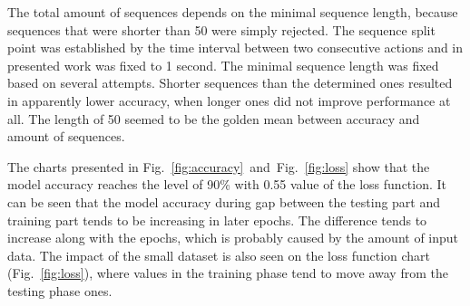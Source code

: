 The total amount of sequences depends on the minimal sequence length, because sequences that were shorter than 50 were simply rejected.
The sequence split point was established by the time interval between two consecutive actions and in presented work was fixed to 1 second.
The minimal sequence length was fixed based on several attempts.
Shorter sequences than the determined ones resulted in apparently lower accuracy, when longer ones did not improve performance at all.
The length of 50 seemed to be the golden mean between accuracy and amount of sequences.

The charts presented in \mbox{Fig.~\ref{fig:accuracy} and Fig.~\ref{fig:loss}} show that the model accuracy reaches the level of 90\% with 0.55 value of the loss function.
It can be seen that the model accuracy during gap between the testing part and training part tends to be increasing in later epochs.
The difference tends to increase along with the epochs, which is probably caused by the amount of input data.
The impact of the small dataset is also seen on the loss function chart \mbox{(Fig.~\ref{fig:loss})}, where values in the training phase tend to move away from the testing phase ones.

